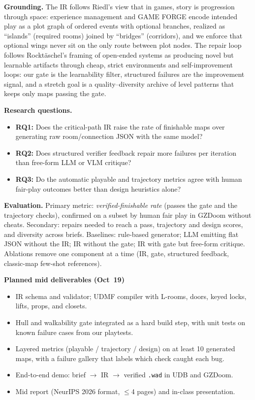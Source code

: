 \documentclass[11pt]{article}
\begin{document}
\vspace{0.3em}
\noindent\textbf{Grounding.}
The IR follows Riedl's view that in games, story is progression through space: experience management and GAME FORGE encode intended play as a plot graph of ordered events with optional branches, realized as ``islands'' (required rooms) joined by ``bridges'' (corridors), and we enforce that optional wings never sit on the only route between plot nodes.
The repair loop follows Rockt\"aschel's framing of open-ended systems as producing novel but learnable artifacts through cheap, strict environments and self-improvement loops: our gate is the learnability filter, structured failures are the improvement signal, and a stretch goal is a quality--diversity archive of level patterns that keeps only maps passing the gate.

\vspace{0.2em}
\noindent\textbf{Research questions.}
\begin{itemize}
  \item \textbf{RQ1:} Does the critical-path IR raise the rate of finishable maps over generating raw room/connection JSON with the same model?
  \item \textbf{RQ2:} Does structured verifier feedback repair more failures per iteration than free-form LLM or VLM critique?
  \item \textbf{RQ3:} Do the automatic playable and trajectory metrics agree with human fair-play outcomes better than design heuristics alone?
\end{itemize}

\vspace{0.2em}
\noindent\textbf{Evaluation.}
Primary metric: \emph{verified-finishable rate} (passes the gate and the trajectory checks), confirmed on a subset by human fair play in GZDoom without cheats.
Secondary: repairs needed to reach a pass, trajectory and design scores, and diversity across briefs.
Baselines: rule-based generator; LLM emitting flat JSON without the IR; IR without the gate; IR with gate but free-form critique.
Ablations remove one component at a time (IR, gate, structured feedback, classic-map few-shot references).

\vspace{0.45em}
\noindent\textbf{Planned mid deliverables (Oct~19)}
\begin{itemize}
  \item IR schema and validator; UDMF compiler with L-rooms, doors, keyed locks, lifts, props, and closets.
  \item Hull and walkability gate integrated as a hard build step, with unit tests on known failure cases from our playtests.
  \item Layered metrics (playable / trajectory / design) on at least 10 generated maps, with a failure gallery that labels which check caught each bug.
  \item End-to-end demo: brief $\rightarrow$ IR $\rightarrow$ verified \texttt{.wad} in UDB and GZDoom.
  \item Mid report (NeurIPS 2026 format, $\leq$4 pages) and in-class presentation.
\end{itemize}
\end{document}
